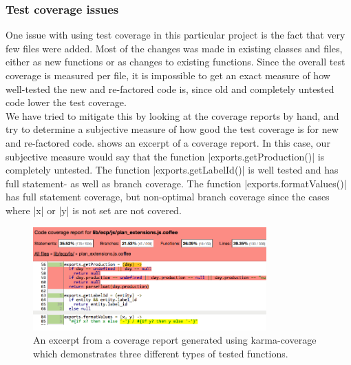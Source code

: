 \subsubsection{Test coverage issues}

One issue with using test coverage in this particular project is the
fact that very few files were added. Most of the changes was made in
existing classes and files, either as new functions or as changes to
existing functions. Since the overall test coverage is measured per
file, it is impossible to get an exact measure of how well-tested the
new and re-factored code is, since old and completely untested code
lower the test coverage.\\

We have tried to mitigate this by looking at the coverage reports by
hand, and try to determine a subjective measure of how good the test
coverage is for new and re-factored code. 
shows an excerpt of a coverage report. In this case, our subjective
measure would say that the function |exports.getProduction()| is
completely untested. The function |exports.getLabelId()| is well tested
and has full statement- as well as branch coverage. The function
|exports.formatValues()| has full statement coverage, but non-optimal
branch coverage since the cases where |x| or |y| is not set are not
covered.\\

\begin{figure}
\centering
\includegraphics[width=0.8\textwidth]{results/choices/js_coverage}
\caption{An excerpt from a coverage report generated using karma-coverage
         which demonstrates three different types of tested functions.}
\label{fig:coverage_example}
\end{figure}
